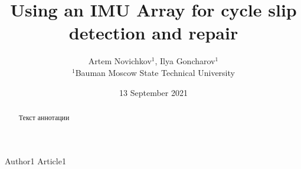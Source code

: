 \documentclass{article}      %
\title{Using an IMU Array for cycle slip detection and repair}  %
\author{Artem Novichkov$^{1}$, Ilya Goncharov$^{1}$ \\
	\small $^{1}$Bauman Moscow State Technical University
}  %
\date{13 September 2021}     %
\begin{document}
\maketitle                   %

\tableofcontents

\begin{abstract}
	Текст аннотации
\end{abstract}











\begin{thebibliography}{00}
	 Author1 Article1
\end{thebibliography}
\end{document}
